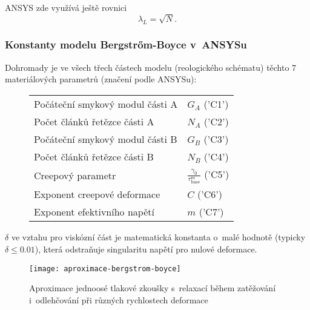 ANSYS zde využívá ještě rovnici
\begin{equation}
	\lambda_L = \sqrt{N}.
\end{equation}

\subsubsection{Konstanty modelu Bergstrőm-Boyce v~ANSYSu}
Dohromady je ve všech třech částech modelu (reologického schématu) těchto 7 materiálových parametrů (značení podle ANSYSu):
\begin{figure}[H]\label{tab:konstanty-bergstrom-boyce}
	\centering
	\begin{tabular}{ll}\toprule
		Počáteční smykový modul části A & $G_A$ ('C1')\\
		Počet článků řetězce části A & $N_A$ ('C2')\\
		Počáteční smykový modul části B & $G_B$ ('C3')\\
		Počet článků řetězce části B & $N_B$ ('C4')\\
		Creepový parametr & $\tfrac{\gamma_0}{\tau_\text{base}^m}$ ('C5')\\
		Exponent creepové deformace & $C$ ('C6')\\
		Exponent efektivního napětí & $m$ ('C7')\\
	\bottomrule\end{tabular}
\end{figure}

$\delta$ ve vztahu pro viskózní část je matematická konstanta o~malé hodnotě (typicky $\delta \leq \num{0.01}$), která odstraňuje singularitu napětí pro nulové deformace.

\begin{figure}[H]
	\centering
	\texttt{[image: aproximace-bergstrom-boyce]}
	\caption{Aproximace jednoosé tlakové zkoušky s~relaxací během zatěžování i~odlehčování při různých rychlostech deformace}
	\label{fig:aproximace-bergstrom-boyce}
\end{figure}
